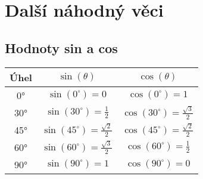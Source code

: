 \section{Další náhodný věci}

\subsection*{Hodnoty sin a cos}

\begin{table}[ht]
	\centering
	\begin{tabular}{|c|c|c|}
		\hline
		Úhel & $\sin(\theta)$ & $\cos(\theta)$ \\
		\hline \hline
		0° & $\sin(0^\circ) = 0$ & $\cos(0^\circ) = 1$ \\
		\hline
		30° & $\sin(30^\circ) = \frac{1}{2}$ & $\cos(30^\circ) = \frac{\sqrt{3}}{2}$ \\
		\hline
		45° & $\sin(45^\circ) = \frac{\sqrt{2}}{2}$ & $\cos(45^\circ) = \frac{\sqrt{2}}{2}$ \\
		\hline
		60° & $\sin(60^\circ) = \frac{\sqrt{3}}{2}$ & $\cos(60^\circ) = \frac{1}{2}$ \\
		\hline
		90° & $\sin(90^\circ) = 1$ & $\cos(90^\circ) = 0$ \\
		\hline
	\end{tabular}
\end{table}

